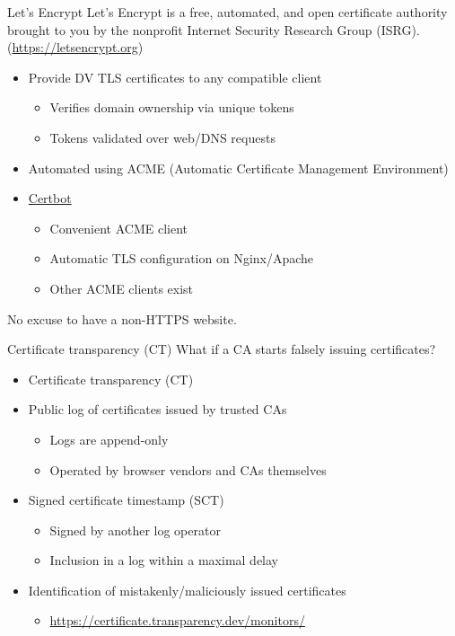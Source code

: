 \begin{frame}{Let's Encrypt}
  \pause
  Let's Encrypt is a free, automated, and open certificate authority brought to you by the nonprofit Internet Security Research Group (ISRG). ({\scriptsize\url{https://letsencrypt.org}})
  \begin{itemize}[<+(1)->]
    \item Provide DV TLS certificates to any compatible client
    \begin{itemize}
      \item Verifies domain ownership via unique tokens
      \item Tokens validated over web/DNS requests
    \end{itemize}
    \item Automated using ACME (Automatic Certificate Management Environment)
    \item \href{https://certbot.eff.org}{Certbot}
    \begin{itemize}
      \item Convenient ACME client
      \item Automatic TLS configuration on Nginx/Apache
      \item Other ACME clients exist
    \end{itemize}
  \end{itemize}

  \pause
  No excuse to have a non-HTTPS website.
\end{frame}

\begin{frame}{Certificate transparency (CT)}
  What if a CA starts falsely issuing certificates?
  \begin{itemize}[<+(1)->]
    \item Certificate transparency (CT)
    \item Public log of certificates issued by trusted CAs
    \begin{itemize}
      \item Logs are append-only
      \item Operated by browser vendors and CAs themselves
    \end{itemize}
    \item Signed certificate timestamp (SCT)
    \begin{itemize}
      \item Signed by another log operator
      \item Inclusion in a log within a maximal delay
    \end{itemize}
    \item Identification of mistakenly/maliciously issued certificates
    \begin{itemize}
      \item {\small{\url{https://certificate.transparency.dev/monitors/}}}
    \end{itemize}
  \end{itemize}
\end{frame}

